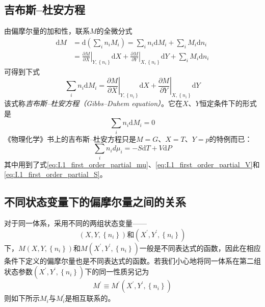 \documentclass[main.tex]{subfiles}
\begin{document}
\subsection{吉布斯--杜安方程}
由偏摩尔量的加和性，联系$M$的全微分式
\begin{align*}
  \mathrm{d}M & =\mathrm{d}\left(\sum_in_iM_i\right)=\sum_in_i\mathrm{d}M_i+\sum_iM_i\mathrm{d}n_i                                                                                                \\
              & =\left.\frac{\partial M}{\partial X}\right|_{Y,\left\{n_i\right\}}\mathrm{d}X+\left.\frac{\partial M}{\partial Y}\right|_{X,\left\{n_i\right\}}\mathrm{d}Y+\sum_iM_i\mathrm{d}n_i
\end{align*}
可得到下式
\begin{equation}\label{eq:II.2_Gibbs_Duhem_eq}
  \sum_in_i\mathrm{d}M_i=\left.\frac{\partial M}{\partial X}\right|_{Y,\left\{n_i\right\}}\mathrm{d}X+\left.\frac{\partial M}{\partial Y}\right|_{X,\left\{n_i\right\}}\mathrm{d}Y
\end{equation}
该式称\emph{吉布斯--杜安方程（Gibbs--Duhem equation）}。它在$X$、$Y$恒定条件下的形式是
\begin{equation}\label{eq:II.2_Gibbs_Duhem_eq_XYConst}
  \sum_in_i\mathrm{d}M_i=0
\end{equation}
《物理化学》书上的吉布斯--杜安方程只是$M=G$、$X=T$、$Y=p$的特例而已：
\begin{equation}\label{eq:II.2_Gibbs_Duhem_eq_for_G}
  \sum_in_id\mu_i=-S\mathrm{d}T+V\mathrm{d}P
\end{equation}
其中用到了式\eqref{eq:I.1_first_order_partial_mu}、\eqref{eq:I.1_first_order_partial_V}和\eqref{eq:I.1_first_order_partial_S}。


\subsection{不同状态变量下的偏摩尔量之间的关系}
对于同一体系，采用不同的两组状态变量——
\[\left(X,Y,\left\{n_i\right\}\right)\text{和}\left(X^\prime,Y^\prime,\left\{n_i\right\}\right)\]
下，$M\left(X,Y,\left\{n_i\right\}\right)$和$M\left(X^\prime, Y^\prime,\left\{n_i\right\}\right)$一般是不同表达式的函数，因此在相应条件下定义的偏摩尔量也是不同表达式的函数。若我们小心地将同一体系在第二组状态参数$\left(X^\prime,Y^\prime,\left\{n_i\right\}\right)$下的同一性质另记为
\[M^\prime\equiv M^\prime\left(X^\prime,Y^\prime,\left\{n_i\right\}\right)\]
则如下所示$M_i$与$M_i^\prime$是相互联系的。
\end{document}
